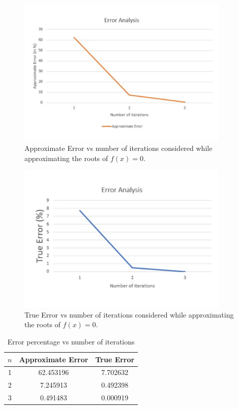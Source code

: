 \documentclass[titlepage, 11pt]{article}
\begin{document}
\begin{figure}[!tbh]
  	\centering
  	\includegraphics[width=0.9\textwidth]{Error-Analysis.pdf}
  	\caption{Approximate Error vs number of iterations considered while approximating the roots of $f(x)=0$.}
  	\label{fig:6} 
\end{figure}
\begin{figure}[!tbh]
  	\centering
  	\includegraphics[width=0.9\textwidth]{TE3.pdf}
  	\caption{True Error vs number of iterations considered while approximating the roots of $f(x)=0$.}
  	\label{fig:86} 
\end{figure}
\begin{table}[!htb]
    \caption{Error percentage vs number of iterations}
    \centering
    \begin{tabular}{ccc}
    \toprule
    \textbf{$n$}& \textbf{Approximate Error} & \textbf{True Error}\\
    \midrule
         1 & 62.453196 & 7.702632\\
         2 & 7.245913 & 0.492398\\
         3 & 0.491483 & 0.000919\\
    \bottomrule 
    \end{tabular}
    \label{tab:tab3}
\end{table}
\end{document}
